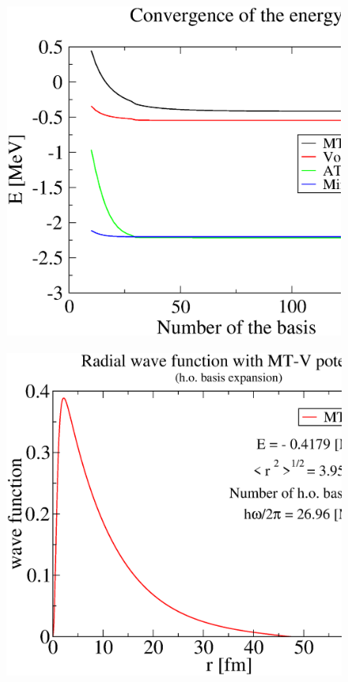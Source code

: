 \documentclass[12pt,a4paper,titlepage]{jarticle}
\begin{document}
\begin{figure}[H]
\begin{center}
\includegraphics[width=140mm,height=110mm]{energy.eps}
\end{center}
\end{figure}

\newpage

\begin{figure}[H]
\begin{center}
\includegraphics[width=140mm,height=110mm]{wf_ho1.eps}
\end{center}
\end{figure}
\end{document}
